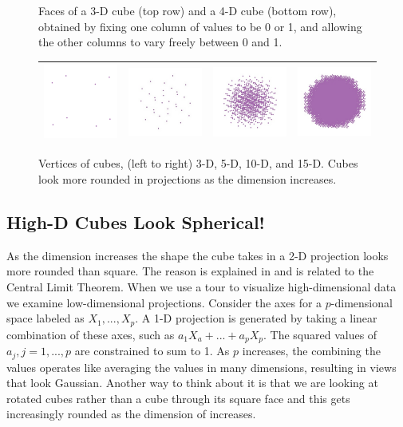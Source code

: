 \begin{figure}[ht]
  \caption{Faces of a 3-D cube (top row) and a 4-D cube (bottom row), obtained by fixing one column of values to be 0 or 1, and allowing the other columns to vary freely between 0 and 1.}
  \label{faces}
\end{figure}

\begin{figure}[ht]
\centering
\begin{tabular}{|c|c|c|c|}
\hline
\includegraphics[width=1in]{fig/cube-3-vert.pdf} & \includegraphics[width=1in]{fig/cube-5-vert.pdf} &
\includegraphics[width=1in]{fig/cube-10-vert.pdf} & \includegraphics[width=1in]{fig/cube-15-vert.pdf} \\
\hline
\end{tabular}
\caption{Vertices of cubes, (left to right) 3-D, 5-D, 10-D, and 15-D. Cubes look more
  rounded in projections as the dimension increases.}
\end{figure}

\subsection{High-D Cubes Look Spherical!}

As the dimension increases the shape the cube takes in a 2-D
projection looks more rounded than square. The reason is explained in
\citet{DF84} and is related to the Central Limit Theorem. When we use
a tour to visualize high-dimensional data we examine low-dimensional
projections.  Consider the axes for a $p$-dimensional space labeled as
$X_1, ..., X_p$. A 1-D projection is generated by taking a linear
combination of these axes, such as $a_1X_a+...+a_pX_p$. The squared
values of $a_j, j=1, ..., p$ are constrained to sum to 1. As $p$
increases, the combining the values operates like averaging the values
in many dimensions, resulting in views that look Gaussian. Another way
to think about it is that we are looking at rotated cubes rather than
a cube through its square face and this gets increasingly rounded as
the dimension of increases. 


